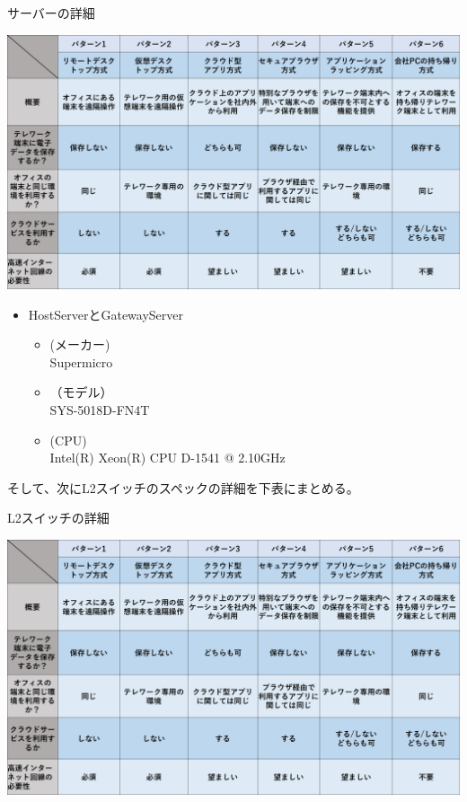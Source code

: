 \documentclass[11pt,a4j,titlepage]{jreport}
\begin{document}
\begin{table}[tbp]
    \centering
    \caption{サーバーの詳細}
    \includegraphics*[width=1.0\textwidth,page=6]{graphs/telework_list.pdf}
    \label{server_detail}
\end{table}


\begin{itemize}
    \setlength{\parskip}{0.05cm} %
    \setlength{\itemsep}{0.05cm}
    \item HostServerとGatewayServer\mbox{}
    \begin{itemize}
        \item (メーカー)\mbox{}\\Supermicro
        \item （モデル）\mbox{}\\SYS-5018D-FN4T
        \item (CPU)\mbox{} \\
            Intel(R) Xeon(R) CPU D-1541 @ 2.10GHz
    \end{itemize}
    
\end{itemize}
\fi
そして、次にL2スイッチのスペックの詳細を下表にまとめる。


\begin{table}[tbp]
    \centering
    \caption{L2スイッチの詳細}
    \includegraphics*[width=1.0\textwidth,page=7]{graphs/telework_list.pdf}
    \label{switch_detail}
\end{table}
\end{document}
